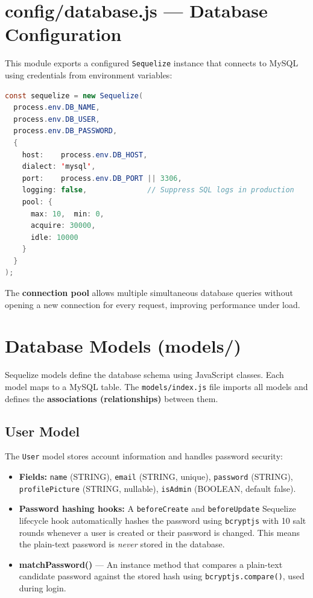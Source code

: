 \documentclass[12pt,a4paper]{report}
\begin{document}
\section{config/database.js --- Database Configuration}

This module exports a configured \texttt{Sequelize} instance that connects to MySQL using credentials from environment variables:

\begin{lstlisting}[language=Java, caption={config/database.js}]
const sequelize = new Sequelize(
  process.env.DB_NAME,
  process.env.DB_USER,
  process.env.DB_PASSWORD,
  {
    host:    process.env.DB_HOST,
    dialect: 'mysql',
    port:    process.env.DB_PORT || 3306,
    logging: false,              // Suppress SQL logs in production
    pool: {
      max: 10,  min: 0,
      acquire: 30000,
      idle: 10000
    }
  }
);
\end{lstlisting}

The \textbf{connection pool} allows multiple simultaneous database queries without opening a new connection for every request, improving performance under load.

\section{Database Models (models/)}

Sequelize models define the database schema using JavaScript classes. Each model maps to a MySQL table. The \texttt{models/index.js} file imports all models and defines the \textbf{associations (relationships)} between them.

\subsection{User Model}

The \texttt{User} model stores account information and handles password security:

\begin{itemize}[leftmargin=2em]
  \item \textbf{Fields:} \texttt{name} (STRING), \texttt{email} (STRING, unique), \texttt{password} (STRING), \texttt{profilePicture} (STRING, nullable), \texttt{isAdmin} (BOOLEAN, default false).
  \item \textbf{Password hashing hooks:} A \texttt{beforeCreate} and \texttt{beforeUpdate} Sequelize lifecycle hook automatically hashes the password using \texttt{bcryptjs} with 10 salt rounds whenever a user is created or their password is changed. This means the plain-text password is \emph{never} stored in the database.
  \item \textbf{matchPassword()} — An instance method that compares a plain-text candidate password against the stored hash using \texttt{bcryptjs.compare()}, used during login.
\end{itemize}
\end{document}
